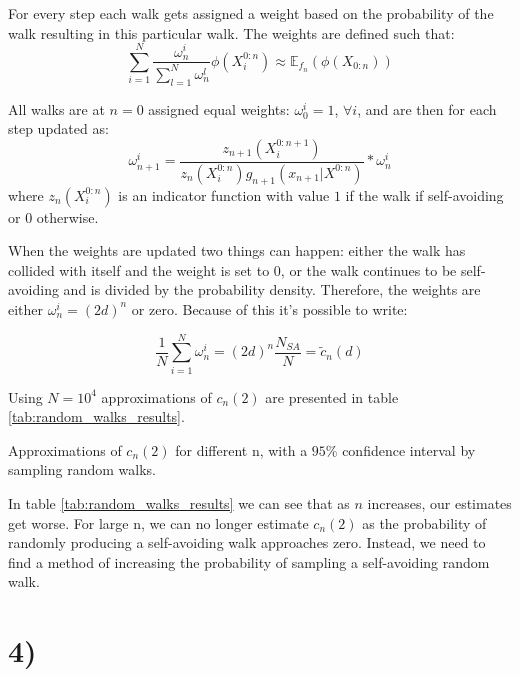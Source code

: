 \documentclass[a4paper]{article}
\begin{document}
For every step each walk gets assigned a weight based on the probability of the walk resulting in this particular walk. The weights are defined such that:
\begin{equation}
    \sum_{i = 1}^N\frac{\omega_n^i}{\sum_{l=1}^N\omega_n^l}\phi(X_i^{0:n}) \approx \mathbb{E}_{f_n}(\phi(X_{0:n})) 
\end{equation}

All walks are at $n = 0$ assigned equal weights: $\omega_0^i = 1$, $\forall i$, and are then for each step updated as:
\begin{equation}
    \label{eq:weights}
    \omega_{n+1}^i = \frac{z_{n+1}(X_i^{0:n+1})}{z_{n}(X_i^{0:n})g_{n+1}(x_{n+1}|X^{0:n})} * \omega_n^i
\end{equation}
where $z_n(X_i^{0:n})$ is an indicator function with value $1$ if the walk if self-avoiding or $0$ otherwise.

When the weights are updated two things can happen: either the walk has collided with itself and the weight is set to $0$, or the walk continues to be self-avoiding and is divided by the probability density. Therefore, the weights are either $\omega_n^i = (2d)^n$ or zero. Because of this it's possible to write:

\begin{equation}
   \frac{1}{N}\sum_{i=1}^N\omega_n^i = (2d)^n \frac{N_{SA}}{N} = \tilde{c}_n(d)
\end{equation}

Using $N = 10^4$ approximations of $c_n(2)$ are presented in table \ref{tab:random_walks_results}.

\begin{table}[H]
    \centering
    \caption{Approximations of $c_n(2)$ for different n, with a $95\%$ confidence interval by sampling random walks.}
    \label{tab:random_walks_results}
    
\end{table}

In table \ref{tab:random_walks_results} we can see that as $n$ increases, our estimates get worse. For large n, we can no longer estimate $c_n(2)$ as the probability of randomly producing a self-avoiding walk approaches zero. Instead, we need to find a method of increasing the probability of sampling a self-avoiding random walk.

\section*{4)}
\end{document}
